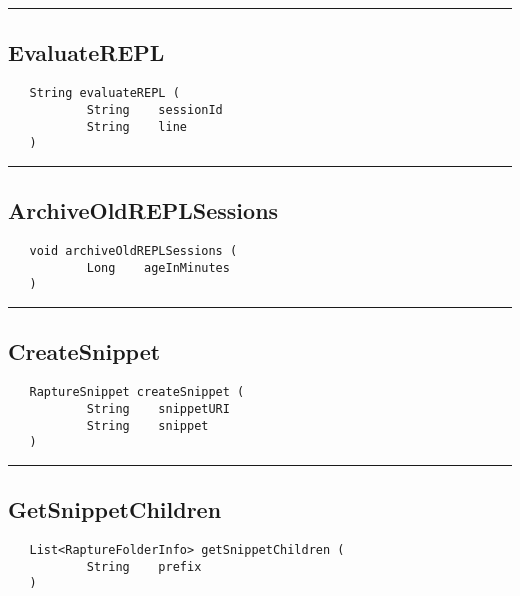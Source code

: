 \rule{15cm}{2pt}
\subsection{EvaluateREPL}
\label{Api:EvaluateREPL}
\begin{verbatim}
   String evaluateREPL (
           String    sessionId
           String    line
   )
\end{verbatim}



\rule{15cm}{2pt}
\subsection{ArchiveOldREPLSessions}
\label{Api:ArchiveOldREPLSessions}
\begin{verbatim}
   void archiveOldREPLSessions (
           Long    ageInMinutes
   )
\end{verbatim}



\rule{15cm}{2pt}
\subsection{CreateSnippet}
\label{Api:CreateSnippet}
\begin{verbatim}
   RaptureSnippet createSnippet (
           String    snippetURI
           String    snippet
   )
\end{verbatim}



\rule{15cm}{2pt}
\subsection{GetSnippetChildren}
\label{Api:GetSnippetChildren}
\begin{verbatim}
   List<RaptureFolderInfo> getSnippetChildren (
           String    prefix
   )
\end{verbatim}



